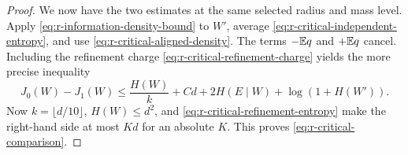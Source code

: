 \begin{proof}
We now have the two estimates at the same selected radius and
mass level.  Apply \eqref{eq:r-information-density-bound} to
\(W'\), average \eqref{eq:r-critical-independent-entropy}, and
use \eqref{eq:r-critical-aligned-density}.  The terms
\(-\mathbb E q\) and \(+\mathbb E q\) cancel.  Including the refinement charge
\eqref{eq:r-critical-refinement-charge} yields the more precise
inequality
\begin{equation}\label{eq:r-critical-quantitative-gap}
 J_0(W)-J_1(W)
 \le\frac{H(W)}k+Cd+2H(E\mid W)+\log(1+H(W')).
\end{equation}
Now \(k=\lfloor d/10\rfloor\), \(H(W)\le d^2\), and
\eqref{eq:r-critical-refinement-entropy} make the right-hand side
at most \(Kd\) for an absolute \(K\).  This proves
\eqref{eq:r-critical-comparison}.
\end{proof}
